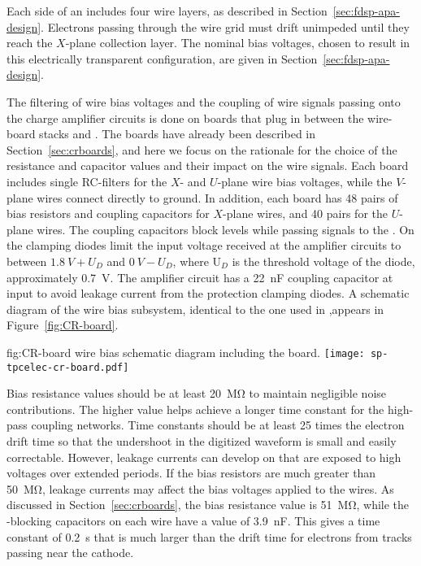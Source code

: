 Each side of an  includes four wire layers, as 
described in Section~\ref{sec:fdsp-apa-design}. Electrons passing 
through the wire grid must drift unimpeded until they reach 
the $X$-plane collection layer. The nominal bias voltages, chosen %
to result in this electrically transparent configuration, %
are given in Section~\ref{sec:fdsp-apa-design}. 

The filtering of wire bias voltages and the  coupling 
of wire signals passing onto the charge amplifier circuits is 
done on  boards that plug in between the  
wire-board stacks and . The  boards
have already been described in Section~\ref{sec:crboards},
and here we focus on the rationale for the choice of the %
resistance and capacitor values and their impact on the
wire signals. Each  board includes single RC-filters 
for the $X$- and $U$-plane wire bias voltages, while the $V$-plane 
wires connect directly %
to ground. In addition, each board 
has \num{48} pairs of bias resistors and  coupling 
capacitors for $X$-plane wires, and \num{40} pairs for the $U$-plane 
wires. The coupling capacitors block  levels while passing  
signals to the . On the  
clamping diodes limit the input voltage received at the amplifier
circuits to between $\SI{1.8}{V}+U_D$ and $\SI{0}{V}-U_D$, where U$_D$
is the threshold voltage of the diode, approximately \SI{0.7}{V}.
The amplifier circuit has a \SI{22}{nF} coupling capacitor at
input to avoid leakage current from the protection clamping diodes.
A schematic diagram of the   wire bias 
subsystem, identical to the one used in ,appears  %
in Figure~\ref{fig:CR-board}.

\begin{dunefigure}
{fig:CR-board}
{  wire bias schematic diagram including the  board.}
\texttt{[image: sp-tpcelec-cr-board.pdf]}
\end{dunefigure}

Bias resistance values should be at least \SI{20}{\mega\ohm} to 
maintain negligible noise contributions. The higher value helps 
achieve a longer time constant for the high-pass coupling networks.
Time constants should be at least \num{25} times the electron 
drift time so that the undershoot in the digitized waveform
is small and easily correctable. However, leakage currents can 
develop on  that are exposed to high voltages over 
extended periods. If the bias resistors are much greater than 
\SI{50}{\mega\ohm}, leakage currents may affect the bias voltages 
applied to the wires. As discussed in Section~\ref{sec:crboards},
the bias resistance value is \SI{51}{\mega\ohm}, while the 
-blocking capacitors on each wire have a value of
\SI{3.9}{nF}. This gives a time constant of \SI{0.2}{s} that
is much larger than the drift time for electrons from tracks
passing near the cathode.

